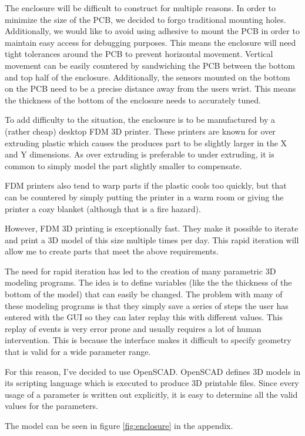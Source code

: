 
The enclosure will be difficult to construct for multiple reasons.  In order to
minimize the size of the PCB, we decided to forgo traditional mounting holes.
Additionally, we would like to avoid using adhesive to mount the PCB in order
to maintain easy access for debugging purposes.  This means the enclosure will
need tight tolerances around the PCB to prevent horizontal movement.  Vertical
movement can be easily countered by sandwiching the PCB between the bottom and
top half of the enclosure.  Additionally, the sensors mounted on the bottom on
the PCB need to be a precise distance away from the users wrist.  This means
the thickness of the bottom of the enclosure needs to accurately tuned.

To add difficulty to the situation, the enclosure is to be manufactured by a
(rather cheap) desktop FDM 3D printer.  These printers are known for over
extruding plastic which causes the produces part to be slightly larger in the X
and Y dimensions.  As over extruding is preferable to under extruding, it is
common to simply model the part slightly smaller to compensate.

FDM printers also tend to warp parts if the plastic cools too quickly, but that
can be countered by simply putting the printer in a warm room or giving the
printer a cozy blanket (although that is a fire hazard).

However, FDM 3D printing is exceptionally fast.  They make it possible to
iterate and print a 3D model of this size multiple times per day.  This rapid
iteration will allow me to create parts that meet the above requirements.

The need for rapid iteration has led to the creation of many parametric 3D
modeling programs.  The idea is to define variables (like the the thickness of
the bottom of the model) that can easily be changed.  The problem with many of
these modeling programs is that they simply save a series of steps the user has
entered with the GUI so they can later replay this with different values.  This
replay of events is very error prone and usually requires a lot of human
intervention.  This is because the interface makes it difficult to specify
geometry that is valid for a wide parameter range.

For this reason, I've decided to use OpenSCAD.  OpenSCAD defines 3D models in
its scripting language which is executed to produce 3D printable files.  Since
every usage of a parameter is written out explicitly, it is easy to determine
all the valid values for the parameters.

The model can be seen in figure \ref{fig:enclosure} in the appendix.
